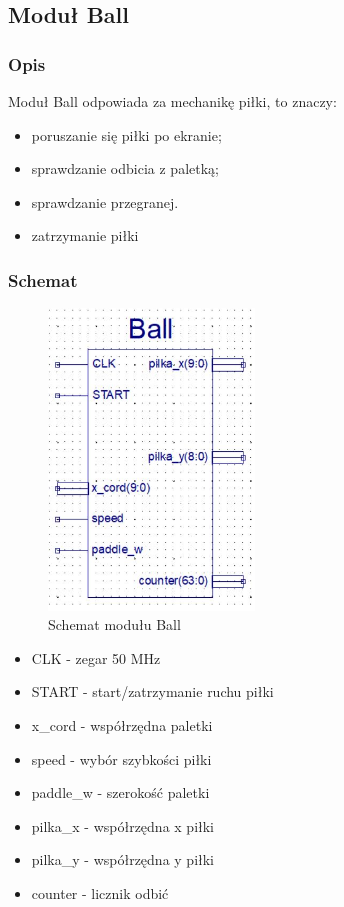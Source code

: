 \documentclass[12pt,a4paper]{article}
\begin{document}
\subsection{Moduł Ball}
\subsubsection{Opis}
Moduł Ball odpowiada za mechanikę piłki, to znaczy:
\begin{itemize}
    \item poruszanie się piłki po ekranie;
    \item sprawdzanie odbicia z paletką;
    \item sprawdzanie przegranej.
    \item zatrzymanie piłki
\end{itemize}

\subsubsection{Schemat}




\begin{figure}[h!]
    \centering
    \includegraphics[height=8cm]{ball.JPG}  
    \caption{Schemat modułu Ball}
    \label{fig:my_label}
\end{figure}



\begin{itemize}
    \item CLK - zegar 50 MHz
    \item START - start/zatrzymanie ruchu piłki
    \item x\_cord - współrzędna paletki
    \item speed - wybór szybkości piłki
    \item paddle\_w - szerokość paletki
    \item pilka\_x - współrzędna x piłki
    \item pilka\_y - współrzędna y piłki
    \item counter - licznik odbić
\end{itemize}
\end{document}
